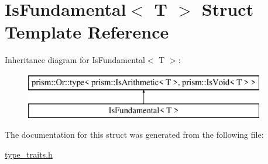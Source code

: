 \hypertarget{struct_is_fundamental}{}\section{Is\+Fundamental$<$ T $>$ Struct Template Reference}
\label{struct_is_fundamental}
Inheritance diagram for Is\+Fundamental$<$ T $>$\+:\begin{figure}[H]
\begin{center}
\leavevmode
\includegraphics[height=2.000000cm]{struct_is_fundamental}
\end{center}
\end{figure}


The documentation for this struct was generated from the following file\+:\begin{DoxyCompactItemize}
\item 
\hyperlink{type__traits_8h}{type\+\_\+traits.\+h}\end{DoxyCompactItemize}
